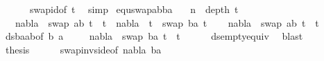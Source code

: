 \begin{isabellebody}
\ \ \ \ \ \ swap{\isacharunderscore}{\kern0pt}id{\isacharbrackleft}{\kern0pt}of\ t{}{\isacharbrackright}{\kern0pt}\ \isamarkupfalse%
\ simp\isacommand{{\isacharbraceright}{\kern0pt}}\isamarkupfalse%
\isanewline
{}\isamarkupfalse%
%
\endisatagproof
{\isafoldproof}%
%
\isadelimproof
\isanewline
%
\endisadelimproof
\isanewline
{}\isamarkupfalse%
\ equ{\isacharunderscore}{\kern0pt}swap{\isacharunderscore}{\kern0pt}abba{\isacharcolon}{\kern0pt}\isanewline
\ \ \ {\isachardoublequoteopen}n\ {\isacharequal}{\kern0pt}\ depth\ t{}{\isachardoublequoteclose}\isanewline
\ \ \ {\isachardoublequoteopen}nabla\ {\isasymturnstile}\ swap\ {\isacharbrackleft}{\kern0pt}{\isacharparenleft}{\kern0pt}a{\isacharcomma}{\kern0pt}b{\isacharparenright}{\kern0pt}{\isacharbrackright}{\kern0pt}\ t{}\ {\isasymapprox}\ t{}\ {\isasymLongrightarrow}\ nabla\ {\isasymturnstile}\ t{}\ {\isasymapprox}\ swap\ {\isacharbrackleft}{\kern0pt}{\isacharparenleft}{\kern0pt}b{\isacharcomma}{\kern0pt}a{\isacharparenright}{\kern0pt}{\isacharbrackright}{\kern0pt}\ t{}{\isachardoublequoteclose}\isanewline
%
\isadelimproof
%
\endisadelimproof
%
\isatagproof
{}\isamarkupfalse%
{\isacharminus}{\kern0pt}\isanewline
\ \ \isamarkupfalse%
\ {\isachardoublequoteopen}nabla\ {\isasymturnstile}\ swap\ {\isacharbrackleft}{\kern0pt}{\isacharparenleft}{\kern0pt}a{\isacharcomma}{\kern0pt}b{\isacharparenright}{\kern0pt}{\isacharbrackright}{\kern0pt}\ t{}\ {\isasymapprox}\ t{}{\isachardoublequoteclose}\isanewline
\ \ \isamarkupfalse%
\ ds{\isacharunderscore}{\kern0pt}baab{\isacharbrackleft}{\kern0pt}of\ b\ a{\isacharbrackright}{\kern0pt}\ \isanewline
\ \ \isamarkupfalse%
\ {\isachardoublequoteopen}nabla\ {\isasymturnstile}\ swap\ {\isacharbrackleft}{\kern0pt}{\isacharparenleft}{\kern0pt}b{\isacharcomma}{\kern0pt}a{\isacharparenright}{\kern0pt}{\isacharbrackright}{\kern0pt}\ t{}\ {\isasymapprox}\ t{}{\isachardoublequoteclose}\isanewline
\ \ \ \ \isamarkupfalse%
\ ds{\isacharunderscore}{\kern0pt}empty{\isacharunderscore}{\kern0pt}equiv{\isacharunderscore}{\kern0pt}{}\ \isamarkupfalse%
\ blast\isanewline
\ \ \ \ \isamarkupfalse%
\ \isamarkupfalse%
\ {\isacharquery}{\kern0pt}thesis\isanewline
\ \ \ \ \isamarkupfalse%
\ swap{\isacharunderscore}{\kern0pt}inv{\isacharunderscore}{\kern0pt}side{\isacharbrackleft}{\kern0pt}of\ nabla\ {\isacartoucheopen}{\isacharbrackleft}{\kern0pt}{\isacharparenleft}{\kern0pt}b{\isacharcomma}{\kern0pt}a{\isacharparenright}{\kern0pt}{\isacharbrackright}{\kern0pt}{\isacartoucheclose}{\isacharbrackright}{\kern0pt}\ \isamarkupfalse%

\end{isabellebody}
